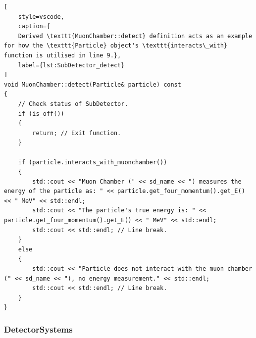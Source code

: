 \documentclass{article}
\begin{document}
\begin{lstlisting}[
    style=vscode, 
    caption={
    Derived \texttt{MuonChamber::detect} definition acts as an example for how the \texttt{Particle} object's \texttt{interacts\_with} function is utilised in line 9.},
    label={lst:SubDetector_detect}
]
void MuonChamber::detect(Particle& particle) const
{
    // Check status of SubDetector.
    if (is_off())
    {
        return; // Exit function.
    }

    if (particle.interacts_with_muonchamber())
    {
        std::cout << "Muon Chamber (" << sd_name << ") measures the energy of the particle as: " << particle.get_four_momentum().get_E() << " MeV" << std::endl;
        std::cout << "The particle's true energy is: " << particle.get_four_momentum().get_E() << " MeV" << std::endl;
        std::cout << std::endl; // Line break.
    }
    else
    {
        std::cout << "Particle does not interact with the muon chamber (" << sd_name << "), no energy measurement." << std::endl;
        std::cout << std::endl; // Line break.
    }
}
\end{lstlisting}

\subsubsection{DetectorSystems}
\label{sec:min_func_DetctorSystems}
\end{document}
